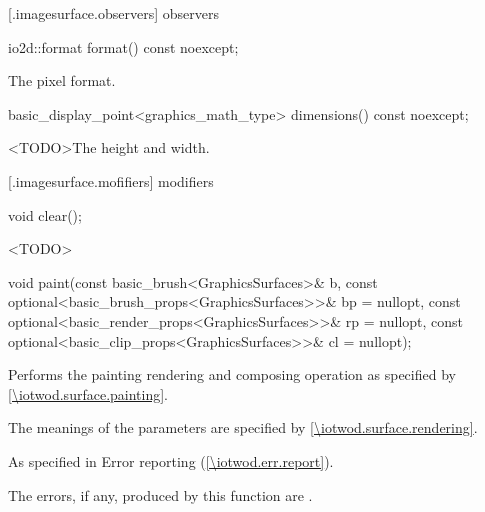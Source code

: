  [\iotwod.imagesurface.observers] { observers}

%
\begin{itemdecl}
io2d::format format() const noexcept;
\end{itemdecl}
\begin{itemdescr}
\pnum
\returns
The pixel format.
\end{itemdescr}

%
\begin{itemdecl}
basic_display_point<graphics_math_type> dimensions() const noexcept;
\end{itemdecl}
\begin{itemdescr}
\pnum
\returns
<TODO>The height and width.
\end{itemdescr}

 [\iotwod.imagesurface.mofifiers] { modifiers}

%
\begin{itemdecl}
void clear();
\end{itemdecl}
\begin{itemdescr}
\pnum
\effects
<TODO>
\end{itemdescr}

%
\begin{itemdecl}
void paint(const basic_brush<GraphicsSurfaces>& b,
  const optional<basic_brush_props<GraphicsSurfaces>>& bp = nullopt,
  const optional<basic_render_props<GraphicsSurfaces>>& rp = nullopt,
  const optional<basic_clip_props<GraphicsSurfaces>>& cl = nullopt);
\end{itemdecl}
\begin{itemdescr}
\pnum
\effects
Performs the painting rendering and composing operation as specified by \ref{\iotwod.surface.painting}.

\pnum
The meanings of the parameters are specified by \ref{\iotwod.surface.rendering}.

\pnum
\throws
As specified in Error reporting (\ref{\iotwod.err.report}).

\pnum
\errors
The errors, if any, produced by this function are .
\end{itemdescr}

